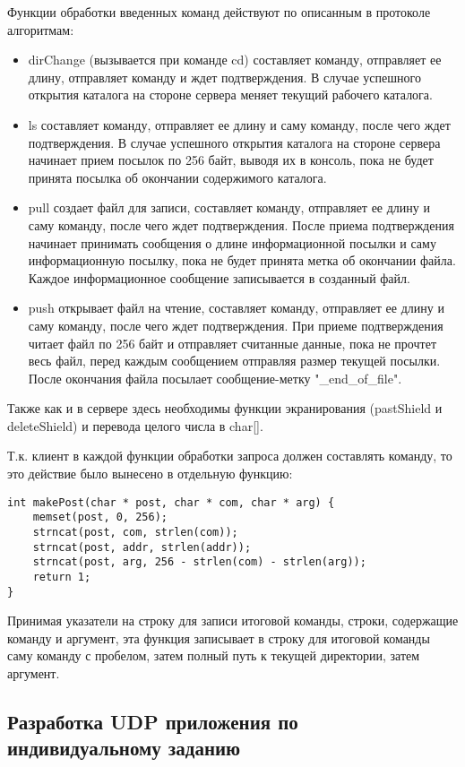 Функции обработки введенных команд действуют по описанным в протоколе алгоритмам:
\begin{itemize}
\item dirChange (вызывается при команде cd) составляет команду, отправляет ее длину, отправляет команду и ждет подтверждения. В случае успешного открытия каталога на стороне сервера меняет текущий рабочего каталога.
\item ls составляет команду, отправляет ее длину и саму команду, после чего ждет подтверждения. В случае успешного открытия каталога на стороне сервера начинает прием посылок по 256 байт, выводя их в консоль, пока не будет принята посылка об окончании содержимого каталога.
\item pull создает файл для записи, составляет команду, отправляет ее длину и саму команду, после чего ждет подтверждения. После приема подтверждения начинает принимать сообщения о длине информационной посылки и саму информационную посылку, пока не будет принята метка об окончании файла. Каждое информационное сообщение записывается в созданный файл.
\item push открывает файл на чтение, составляет команду, отправляет ее длину и саму команду, после чего ждет подтверждения. При приеме подтверждения читает файл по 256 байт и отправляет считанные данные, пока не прочтет весь файл, перед каждым сообщением отправляя размер текущей посылки. После окончания файла посылает сообщение-метку "\_end\_of\_file".
\end{itemize}

Также как и в сервере здесь необходимы функции экранирования (pastShield и deleteShield) и перевода целого числа в char[].

Т.к. клиент в каждой функции обработки запроса должен составлять команду, то это действие было вынесено в отдельную функцию:
\begin{lstlisting}
int makePost(char * post, char * com, char * arg) {
    memset(post, 0, 256);
    strncat(post, com, strlen(com));
    strncat(post, addr, strlen(addr));
    strncat(post, arg, 256 - strlen(com) - strlen(arg));
    return 1;
}
\end{lstlisting}
Принимая указатели на строку для записи итоговой команды, строки, содержащие команду и аргумент, эта функция записывает в строку для итоговой команды саму команду с пробелом, затем полный путь к текущей директории, затем аргумент.

\subsection{Разработка UDP приложения по индивидуальному заданию}
